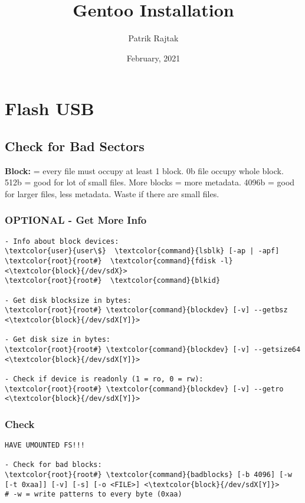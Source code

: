 \documentclass[10pt, a4paper, onecolumn, openany]{book}         %
\title{\textbf{Gentoo Installation}}
\author{Patrik Rajtak}
\date{February, 2021}
\begin{document}
\maketitle                  %
\clearpage                 %
\small

\tableofcontents

\chapter{Flash USB}%

\section{Check for Bad Sectors}
\textbf{Block:} = every file must occupy at least 1 block. 0b file occupy whole block.\newline
512b = good for lot of small files. More blocks = more metadata.\newline
4096b =  good for larger files, less metadata. Waste if there are small files.
\subsection{OPTIONAL - Get More Info}
\begin{Verbatim}[commandchars=\\\{\}]
- Info about block devices:
\textcolor{user}{user\$}  \textcolor{command}{lsblk} [-ap | -apf]
\textcolor{root}{root#}  \textcolor{command}{fdisk -l} <\textcolor{block}{/dev/sdX}>
\textcolor{root}{root#}  \textcolor{command}{blkid}

- Get disk blocksize in bytes:
\textcolor{root}{root#} \textcolor{command}{blockdev} [-v] --getbsz <\textcolor{block}{/dev/sdX[Y]}>

- Get disk size in bytes:
\textcolor{root}{root#} \textcolor{command}{blockdev} [-v] --getsize64 <\textcolor{block}{/dev/sdX[Y]}>

- Check if device is readonly (1 = ro, 0 = rw):
\textcolor{root}{root#} \textcolor{command}{blockdev} [-v] --getro <\textcolor{block}{/dev/sdX[Y]}>
\end{Verbatim}

\subsection{Check}
\begin{Verbatim}[commandchars=\\\{\}]
HAVE UMOUNTED FS!!!

- Check for bad blocks:
\textcolor{root}{root#} \textcolor{command}{badblocks} [-b 4096] [-w [-t 0xaa]] [-v] [-s] [-o <FILE>] <\textcolor{block}{/dev/sdX[Y]}>
# -w = write patterns to every byte (0xaa)
\end{Verbatim}
\end{document}
